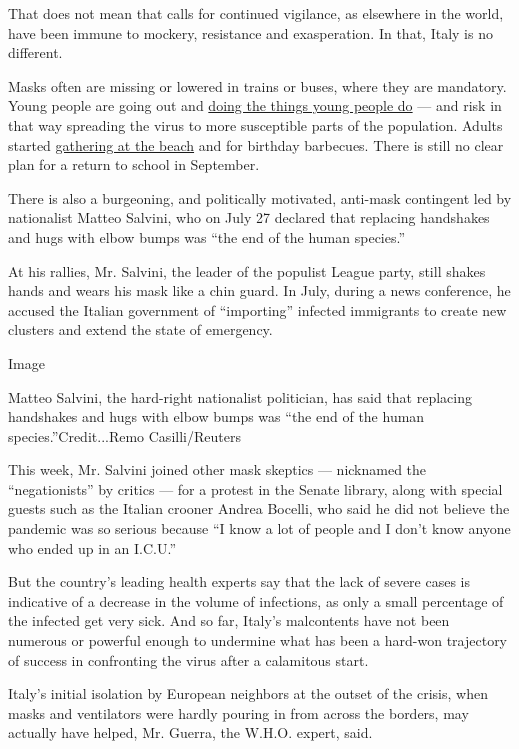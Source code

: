 That does not mean that calls for continued vigilance, as elsewhere in
the world, have been immune to mockery, resistance and exasperation. In
that, Italy is no different.

Masks often are missing or lowered in trains or buses, where they are
mandatory. Young people are going out and
\href{https://www.nytimes.com/2020/05/29/world/europe/italy-young-people-coronavirus.html}{doing
the things young people do} --- and risk in that way spreading the virus
to more susceptible parts of the population. Adults started
\href{https://www.nytimes.com/2020/05/27/world/europe/italy-beaches-coronavirus-reopening.html}{gathering
at the beach} and for birthday barbecues. There is still no clear plan
for a return to school in September.

There is also a burgeoning, and politically motivated, anti-mask
contingent led by nationalist Matteo Salvini, who on July 27 declared
that replacing handshakes and hugs with elbow bumps was ``the end of the
human species.''

At his rallies, Mr. Salvini, the leader of the populist League party,
still shakes hands and wears his mask like a chin guard. In July, during
a news conference, he accused the Italian government of ``importing''
infected immigrants to create new clusters and extend the state of
emergency.

Image

Matteo Salvini, the hard-right nationalist politician, has said that
replacing handshakes and hugs with elbow bumps was ``the end of the
human species.''Credit...Remo Casilli/Reuters

This week, Mr. Salvini joined other mask skeptics --- nicknamed the
``negationists'' by critics --- for a protest in the Senate library,
along with special guests such as the Italian crooner Andrea Bocelli,
who said he did not believe the pandemic was so serious because ``I know
a lot of people and I don't know anyone who ended up in an I.C.U.''

But the country's leading health experts say that the lack of severe
cases is indicative of a decrease in the volume of infections, as only a
small percentage of the infected get very sick. And so far, Italy's
malcontents have not been numerous or powerful enough to undermine what
has been a hard-won trajectory of success in confronting the virus after
a calamitous start.

Italy's initial isolation by European neighbors at the outset of the
crisis, when masks and ventilators were hardly pouring in from across
the borders, may actually have helped, Mr. Guerra, the W.H.O. expert,
said.


